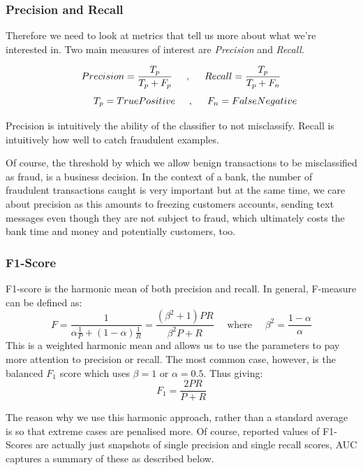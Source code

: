 \documentclass[12pt,a4paper,twoside]{report}
\begin{document}
\subsubsection{Precision and Recall}

Therefore we need to look at metrics that tell us more about what we're interested in. Two main measures of interest are \textit{Precision} and \textit{Recall}.

\[
    {Precision} = \frac{T_p}{T_p+F_p} \hspace{5mm} , \hspace{5mm} {Recall} = \frac{T_p}{T_p+F_n} 
\]
\[
	\hspace{1cm}  {T_p} = {True Positive} \hspace{5mm},\hspace{5mm} {F_n} = {False Negative}
\]

Precision is intuitively the ability of the classifier to not misclassify. Recall is intuitively how well to catch fraudulent examples. 

Of course, the threshold by which we allow benign transactions to be misclassified as fraud, is a business decision. In the context of a bank, the number of fraudulent transactions caught is very important but at the same time, we care about precision as this amounts to freezing customers accounts, sending text messages even though they are not subject to fraud, which ultimately costs the bank time and money and potentially customers, too.

\subsubsection{F1-Score}

F1-score is the harmonic mean of both precision and recall. In general, F-measure can be defined as:
$$F = \frac { 1} { \alpha \frac { 1} { P } + ( 1- \alpha ) \frac { 1} { R } } = \frac { \left( \beta ^ { 2} + 1\right) P R } { \beta ^ { 2} P + R } \quad \text{ where } \quad \beta ^ { 2} = \frac { 1- \alpha } { \alpha }$$
This is a weighted harmonic mean and allows us to use the parameters to pay more attention to precision or recall. The most common case, however, is the balanced $F_1$ score which uses $\beta = 1$ or $\alpha=0.5.$
Thus giving:
$$F _ { 1} = \frac { 2P R } { P + R }$$

The reason why we use this harmonic approach, rather than a standard average is so that extreme cases are penalised more. Of course, reported values of F1-Scores are actually just snapshots of single precision and single recall scores, AUC captures a summary of these as described below. 
\end{document}
